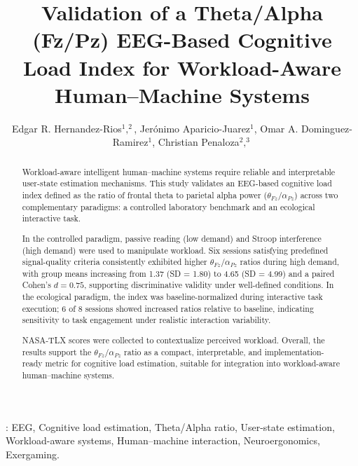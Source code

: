 \documentclass[10pt]{iopart}
\begin{document}
\title[Author guidelines for IOP Publishing journals in  \LaTeXe]
{Validation of a Theta/Alpha (Fz/Pz) EEG-Based Cognitive Load Index for Workload-Aware Human--Machine Systems}

\author{Edgar R. Hernandez-Rios$^1$$,^2$, 
Jerónimo Aparicio-Juarez$^1$, 
Omar A. Dominguez-Ramirez$^1$, 
Christian Penaloza$^2$$,^3$}

\address{$^1$ Universidad Autonoma del Estado de Hidalgo (UAEH), Pachuca, Mexico}
\address{$^2$ Mirai Innovation Research Institute, Osaka, Japan}
\address{$^3$ Universidad Autonoma de Chihuahua (UACH), Chihuahua, Mexico}


\begin{abstract}

Workload-aware intelligent human--machine systems require reliable and interpretable user-state estimation mechanisms. This study validates an EEG-based cognitive load index defined as the ratio of frontal theta to parietal alpha power ($\theta_{Fz}/\alpha_{Pz}$) across two complementary paradigms: a controlled laboratory benchmark and an ecological interactive task.

In the controlled paradigm, passive reading (low demand) and Stroop interference (high demand) were used to manipulate workload. Six sessions satisfying predefined signal-quality criteria consistently exhibited higher $\theta_{Fz}/\alpha_{Pz}$ ratios during high demand, with group means increasing from 1.37 (SD = 1.80) to 4.65 (SD = 4.99) and a paired Cohen's $d=0.75$, supporting discriminative validity under well-defined conditions. In the ecological paradigm, the index was baseline-normalized during interactive task execution; 6 of 8 sessions showed increased ratios relative to baseline, indicating sensitivity to task engagement under realistic interaction variability.

NASA-TLX scores were collected to contextualize perceived workload. Overall, the results support the $\theta_{Fz}/\alpha_{Pz}$ ratio as a compact, interpretable, and implementation-ready metric for cognitive load estimation, suitable for integration into workload-aware human--machine systems.

\end{abstract}

%
\vspace{2pc}
: EEG, Cognitive load estimation, Theta/Alpha ratio, User-state estimation, Workload-aware systems, Human--machine interaction, Neuroergonomics, Exergaming.
%
%
% 
%
\end{document}
